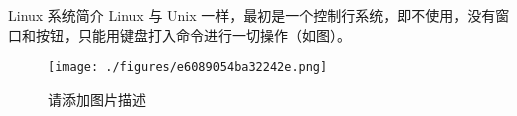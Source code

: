 
\begin{issues}
\issueDraft
\end{issues}

Linux 系统简介
Linux 与 Unix 一样，最初是一个控制行系统，即不使用，没有窗口和按钮，只能用键盘打入命令进行一切操作（如图）。

\begin{figure}[ht]
\centering
\texttt{[image: ./figures/e6089054ba32242e.png]}
\caption{请添加图片描述} \label{fig_Linux0_1}
\end{figure}
